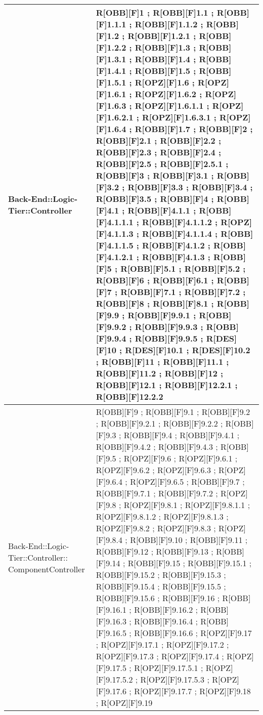 \begin{table}[h]
\begin{tabular}{|p{}|p{}|}
			Back-End::Logic-Tier::Controller & R[OBB][F]1 ; R[OBB][F]1.1 ; R[OBB][F]1.1.1 ; R[OBB][F]1.1.2 ; R[OBB][F]1.2 ; R[OBB][F]1.2.1 ; R[OBB][F]1.2.2 ; R[OBB][F]1.3 ; R[OBB][F]1.3.1 ; R[OBB][F]1.4 ; R[OBB][F]1.4.1 ; R[OBB][F]1.5 ; R[OBB][F]1.5.1 ; R[OPZ][F]1.6 ; R[OPZ][F]1.6.1 ; R[OPZ][F]1.6.2 ; R[OPZ][F]1.6.3 ; R[OPZ][F]1.6.1.1 ; R[OPZ][F]1.6.2.1 ; R[OPZ][F]1.6.3.1 ; R[OPZ][F]1.6.4 ; R[OBB][F]1.7 ; R[OBB][F]2 ; R[OBB][F]2.1 ; R[OBB][F]2.2 ; R[OBB][F]2.3 ; R[OBB][F]2.4 ; R[OBB][F]2.5 ; R[OBB][F]2.5.1 ; R[OBB][F]3 ; R[OBB][F]3.1 ; R[OBB][F]3.2 ; R[OBB][F]3.3 ; R[OBB][F]3.4 ; R[OBB][F]3.5 ;  R[OBB][F]4 ; R[OBB][F]4.1 ; R[OBB][F]4.1.1 ; R[OBB][F]4.1.1.1 ; R[OBB][F]4.1.1.2 ; R[OPZ][F]4.1.1.3 ; R[OBB][F]4.1.1.4 ; R[OBB][F]4.1.1.5 ; R[OBB][F]4.1.2 ; R[OBB][F]4.1.2.1 ; R[OBB][F]4.1.3 ; R[OBB][F]5 ; R[OBB][F]5.1 ; R[OBB][F]5.2 ; R[OBB][F]6 ; R[OBB][F]6.1 ; R[OBB][F]7 ; R[OBB][F]7.1 ; R[OBB][F]7.2 ; R[OBB][F]8 ; R[OBB][F]8.1 ; R[OBB][F]9.9 ; R[OBB][F]9.9.1 ; R[OBB][F]9.9.2 ; R[OBB][F]9.9.3 ; R[OBB][F]9.9.4 ; R[OBB][F]9.9.5 ; R[DES][F]10 ; R[DES][F]10.1 ; R[DES][F]10.2 ; R[OBB][F]11 ; R[OBB][F]11.1 ; R[OBB][F]11.2 ; R[OBB][F]12 ; R[OBB][F]12.1 ; R[OBB][F]12.2.1 ; R[OBB][F]12.2.2 \\ \midrule
			Back-End::Logic-Tier::Controller:: ComponentController & R[OBB][F]9 ; R[OBB][F]9.1 ; R[OBB][F]9.2 ; R[OBB][F]9.2.1 ; R[OBB][F]9.2.2 ; R[OBB][F]9.3 ; R[OBB][F]9.4 ; R[OBB][F]9.4.1 ; R[OBB][F]9.4.2 ; R[OBB][F]9.4.3 ; R[OBB][F]9.5 ; R[OPZ][F]9.6 ; R[OPZ][F]9.6.1 ; R[OPZ][F]9.6.2 ; R[OPZ][F]9.6.3 ; R[OPZ][F]9.6.4 ; R[OPZ][F]9.6.5 ; R[OBB][F]9.7 ; R[OBB][F]9.7.1 ; R[OBB][F]9.7.2 ; R[OPZ][F]9.8 ; R[OPZ][F]9.8.1 ; R[OPZ][F]9.8.1.1 ; R[OPZ][F]9.8.1.2 ; R[OPZ][F]9.8.1.3 ; R[OPZ][F]9.8.2 ; R[OPZ][F]9.8.3 ; R[OPZ][F]9.8.4 ; R[OBB][F]9.10 ; R[OBB][F]9.11 ; R[OBB][F]9.12 ; R[OBB][F]9.13 ; R[OBB][F]9.14 ; R[OBB][F]9.15 ; R[OBB][F]9.15.1 ; R[OBB][F]9.15.2 ; R[OBB][F]9.15.3 ; R[OBB][F]9.15.4 ; R[OBB][F]9.15.5 ; R[OBB][F]9.15.6 ; R[OBB][F]9.16 ; R[OBB][F]9.16.1 ; R[OBB][F]9.16.2 ; R[OBB][F]9.16.3 ; R[OBB][F]9.16.4 ; R[OBB][F]9.16.5 ; R[OBB][F]9.16.6 ; R[OPZ][F]9.17 ; R[OPZ][F]9.17.1 ; R[OPZ][F]9.17.2 ; R[OPZ][F]9.17.3 ; R[OPZ][F]9.17.4 ; R[OPZ][F]9.17.5 ; R[OPZ][F]9.17.5.1 ; R[OPZ][F]9.17.5.2 ; R[OPZ][F]9.17.5.3 ; R[OPZ][F]9.17.6 ; R[OPZ][F]9.17.7 ; R[OPZ][F]9.18 ; R[OPZ][F]9.19 \\ \midrule

		\end{tabular}
	\end{table}

